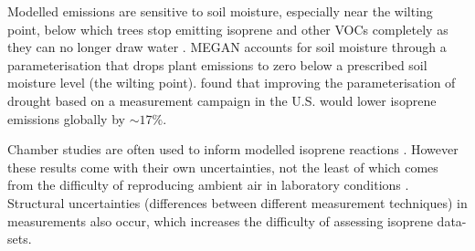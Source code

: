       Modelled emissions are sensitive to soil moisture, especially near the wilting point, below which trees stop emitting isoprene and other VOCs completely as they can no longer draw water \parencite{Bauwens2016}.
      MEGAN accounts for soil moisture through a parameterisation that drops plant emissions to zero below a prescribed soil moisture level (the wilting point).
      \textcite{Jiang2018} found that improving the parameterisation of drought based on a measurement campaign in the U.S. would lower isoprene emissions globally by $\sim17\%$.
      
      
      
      Chamber studies are often used to inform modelled isoprene reactions 
      \parencite[e.g.,][]{Paulot2009b}.
      However these results come with their own uncertainties, not the least of 
      which comes from the difficulty of reproducing ambient air in laboratory 
      conditions \parencite{Nguyen2014}.
      Structural uncertainties (differences between different measurement 
      techniques) in measurements also occur, which increases the difficulty of 
      assessing isoprene data-sets.
      
